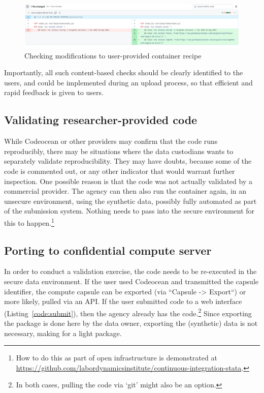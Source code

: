 \documentclass[inline]{hdsr}
\begin{document}
\begin{figure}[hbt]
    \centering
    \includegraphics[width=1\linewidth]{diff-wide-dockerfile.png}
    \caption{Checking modifications to user-provided container recipe}
    \label{fig:docker-diff}
\end{figure}

Importantly, all such content-based checks should be clearly identified to the users, and could be  implemented during an upload process, so that efficient and rapid feedback is given to users. 

\subsection{Validating researcher-provided code}

While Codeocean or other providers may confirm that the code runs reproducibly, there may be situations where the data custodians wants to separately validate reproducibility. They may have doubts, because some of the code is commented out, or any other indicator that would warrant further inspection. One possible reason is that the code was not actually validated by a commercial provider. The agency  can then also run the container again, in an unsecure environment, using the synthetic data, possibly fully automated as part of the submission system. Nothing needs to pass into the secure environment for this to happen.\footnote{How to do this as part of open infrastructure is demonstrated at \url{https://github.com/labordynamicsinstitute/continuous-integration-stata}.} 





\subsection{Porting to confidential compute server}

In order to conduct a validation exercise, the code needs to be re-executed in the secure data environment. If the user used Codeocean and transmitted the capsule identifier, the compute capsule can be exported (via ``Capsule -> Export``) or more likely, pulled via an API. If the user submitted code to a web interface (Listing~\ref{code:submit}), then the agency already has the code.\footnote{In both cases, pulling the code via `git' might also be an option.} Since exporting the package is done here by the data owner, exporting the (synthetic) data is not necessary, making for a light package. 
\end{document}

